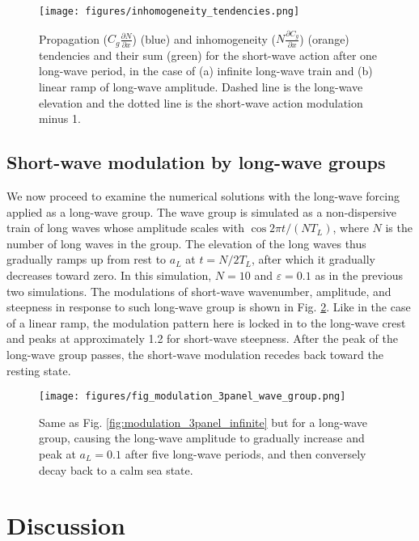 \documentclass[lineno]{jfm}
\begin{document}
\begin{figure}
  \centering
  \texttt{[image: figures/inhomogeneity\_tendencies.png]}
  \caption{
    Propagation ($C_g \frac{\partial N}{\partial x}$) (blue) and inhomogeneity
    ($N \frac{\partial C_g}{\partial x}$) (orange) tendencies and their sum
    (green) for the short-wave action after one long-wave period, in the case of
    (a) infinite long-wave train and (b) linear ramp of long-wave amplitude.
    Dashed line is the long-wave elevation and the dotted line is the short-wave
    action modulation minus 1.
  }
  \label{fig:inhomogeneity_tendencies}
\end{figure}

\subsection{Short-wave modulation by long-wave groups}
\label{subsection:wave_groups}

We now proceed to examine the numerical solutions with the long-wave forcing
applied as a long-wave group.
The wave group is simulated as a non-dispersive train of long waves whose
amplitude scales with $\cos{2 \pi t / (N T_L)}$, where $N$ is the number of
long waves in the group.
The elevation of the long waves thus gradually ramps up from rest to $a_L$ at
$t = N/2 T_L$, after which it gradually decreases toward zero.
In this simulation, $N = 10$ and $\varepsilon = 0.1$ as in the previous two
simulations.
The modulations of short-wave wavenumber, amplitude, and steepness in response
to such long-wave group is shown in Fig. \ref{fig:modulation_3panel_groups}.
Like in the case of a linear ramp, the modulation pattern here is locked in to
the long-wave crest and peaks at approximately 1.2 for short-wave steepness.
After the peak of the long-wave group passes, the short-wave modulation recedes
back toward the resting state.

\begin{figure}
\centering
\texttt{[image: figures/fig\_modulation\_3panel\_wave\_group.png]}
\caption{
  Same as Fig. \ref{fig:modulation_3panel_infinite} but for a long-wave group,
  causing the long-wave amplitude to gradually increase and peak at $a_L = 0.1$
  after five long-wave periods, and then conversely decay back to a calm sea state.
}
\label{fig:modulation_3panel_groups}
\end{figure}

\section{Discussion}
\label{section:discussion}
\end{document}
